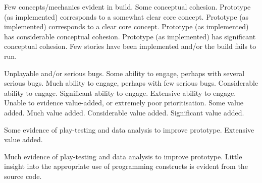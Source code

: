 \documentclass{../../fal_assignment}
\begin{document}
\begin{markingrubric}
%
        \grade \fail Few concepts/mechanics evident in build.
        \grade Some conceptual cohesion.
        \grade Prototype (as implemented) corresponds to a somewhat clear core concept.
        \grade Prototype (as implemented) corresponds to a clear core concept.
        \grade Prototype (as implemented) has considerable conceptual cohesion.
        \grade Prototype (as implemented) has significant conceptual cohesion.
%
        \grade \fail Few stories have been implemented and/or the build fails to run.
            \par Unplayable and/or serious bugs.
        \grade Some ability to engage, perhaps with several serious bugs.
        \grade Much ability to engage, perhaps with few serious bugs.
        \grade Considerable ability to engage.
        \grade Significant ability to engage.
        \grade Extensive ability to engage.
%
        \grade \fail Unable to evidence value-added, or extremely poor prioritisation.
        \grade Some value added.
        \grade Much value added.
        \grade Considerable value added.
        \grade Significant value added.
            \par Some evidence of play-testing and data analysis to improve prototype.
        \grade Extensive value added.
            \par Much evidence of play-testing and data analysis to improve prototype.
%
        \grade \fail Little insight into the appropriate use of programming constructs is evident from the source code.

\end{markingrubric}
\end{document}
